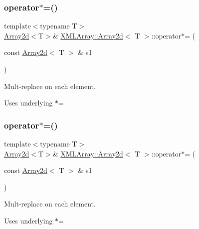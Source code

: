 \subsubsection{\texorpdfstring{operator$\ast$=()}{operator*=()}\hspace{0.1cm}{\footnotesize\ttfamily [2/6]}}
{\footnotesize\ttfamily template$<$typename T$>$ \\
\mbox{\hyperlink{classXMLArray_1_1Array2d}{Array2d}}$<$T$>$\& \mbox{\hyperlink{classXMLArray_1_1Array2d}{X\+M\+L\+Array\+::\+Array2d}}$<$ T $>$\+::operator$\ast$= (\begin{DoxyParamCaption}\item[{const \mbox{\hyperlink{classXMLArray_1_1Array2d}{Array2d}}$<$ T $>$ \&}]{s1 }\end{DoxyParamCaption})\hspace{0.3cm}{\ttfamily [inline]}}



Mult-\/replace on each element. 

Uses underlying $\ast$= \mbox{\label{classXMLArray_1_1Array2d_a591d1e6e7de9fd024657bb6e9264a89b}} 
\subsubsection{\texorpdfstring{operator$\ast$=()}{operator*=()}\hspace{0.1cm}{\footnotesize\ttfamily [3/6]}}
{\footnotesize\ttfamily template$<$typename T$>$ \\
\mbox{\hyperlink{classXMLArray_1_1Array2d}{Array2d}}$<$T$>$\& \mbox{\hyperlink{classXMLArray_1_1Array2d}{X\+M\+L\+Array\+::\+Array2d}}$<$ T $>$\+::operator$\ast$= (\begin{DoxyParamCaption}\item[{const \mbox{\hyperlink{classXMLArray_1_1Array2d}{Array2d}}$<$ T $>$ \&}]{s1 }\end{DoxyParamCaption})\hspace{0.3cm}{\ttfamily [inline]}}



Mult-\/replace on each element. 

Uses underlying $\ast$= \mbox{\label{classXMLArray_1_1Array2d_aee0e6a53c2f9dcc263ba59286d359b38}} 
